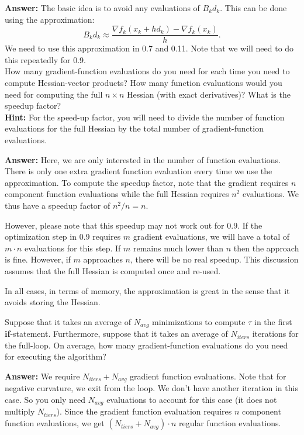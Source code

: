 \documentclass[12pt,legalpaper]{article}
\begin{document}
  \newpage
{\bf Answer:} The basic idea is to avoid any evaluations of $B_k d_k$. This can be done using
the approximation:
\begin{equation*}
   B_k d_k \approx \frac{\nabla f_k (x_k + h d_k) - \nabla f_k (x_k)}{h}.
\end{equation*}
We need to use this approximation in 0.7 and 0.11. Note that we will need to do this repeatedly
for 0.9.\\

 How many gradient-function evaluations do you need
   for each time you need to compute Hessian-vector products? How many function evaluations
   would you need for computing the full $n\times n$ Hessian (with exact derivatives)? What is the speedup factor?\\
   {\bf Hint:} For the speed-up factor, you will need to divide the number of function evaluations for
   the full Hessian by the total number of gradient-function evaluations.

{\bf Answer:} Here, we are only interested in the number of function evaluations. There is only one extra
gradient function evaluation every time we use the approximation. To compute the speedup factor, note that
the gradient requires $n$ component function evaluations while the full Hessian requires $n^2$ evaluations.
We thus have a speedup factor of $n^2 / n = n$. 

However, please note that this speedup may not work out for 0.9. If the optimization step in 0.9 requires
$m$ gradient evaluations, we will have a total of $m \cdot n$ evaluations for this step. If $m$ remains much lower than $n$
then the approach is fine. However, if $m$ approaches $n$, there will be no real speedup. This discussion assumes that the full Hessian 
is computed once and re-used. 

In all cases, in terms of memory, the approximation is great in the sense that it avoids storing the Hessian. 

  Suppose that it takes an average of $N_{avg}$ minimizations
  to compute $\tau$ in the first {\bf if}-statement. Furthermore, suppose that it takes an average of
  $N_{iters}$ iterations for the full-loop. On average, how many gradient-function evaluations do you need 
  for executing the algorithm?
  
 {\bf  Answer:} We require $N_{iters} + N_{avg}$ gradient function evaluations. Note that for negative curvature, we exit from the loop.
 We don't have another iteration in this case. So you only need $N_{avg}$ evaluations to account for this case (it does not multiply $N_{tiers}$).
 Since the gradient function evaluation requires $n$ component function evaluations, we get $(N_{tiers} + N_{avg}) \cdot n$ regular function
 evaluations.
\end{document}
